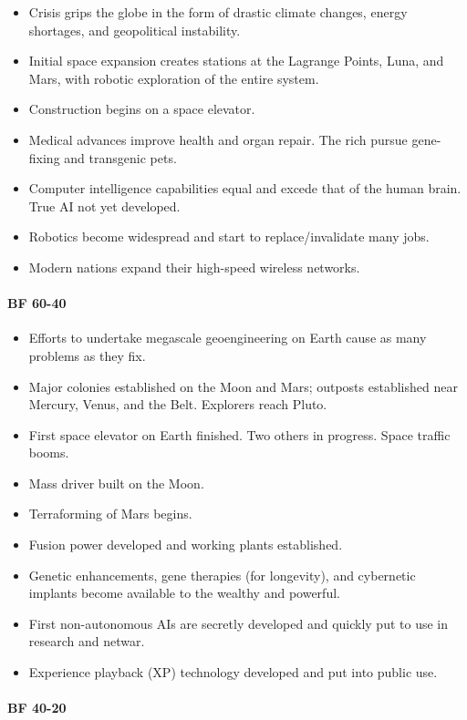 \begin{itemize}
\item Crisis grips the globe in the form of drastic climate changes, energy shortages, and geopolitical instability.
\item Initial space expansion creates stations at the Lagrange Points, Luna, and Mars, with robotic exploration of the entire system.
\item Construction begins on a space elevator.
\item Medical advances improve health and organ repair. The rich pursue gene-fixing and transgenic pets.
\item Computer intelligence capabilities equal and excede that of the human brain. True AI not yet developed.
\item Robotics become widespread and start to replace/invalidate many jobs.
\item Modern nations expand their high-speed wireless networks.
\end{itemize} 

\paragraph{ BF 60-40} 

\begin{itemize}
\item Efforts to undertake megascale geoengineering on Earth cause as many problems as they fix.
\item Major colonies established on the Moon and Mars; outposts established near Mercury, Venus, and the Belt. Explorers reach Pluto.
\item First space elevator on Earth finished. Two others in progress. Space traffic booms.
\item Mass driver built on the Moon.
\item Terraforming of Mars begins.
\item Fusion power developed and working plants established.
\item Genetic enhancements, gene therapies (for longevity), and cybernetic implants become available to the wealthy and powerful.
\item First non-autonomous AIs are secretly developed and quickly put to use in research and netwar.
\item Experience playback (XP) technology developed and put into public use.
\end{itemize} 

\paragraph{BF 40-20} 

